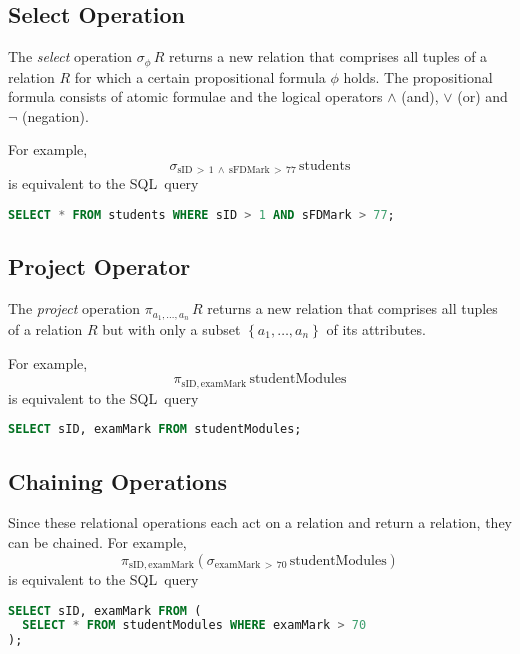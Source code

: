 \subsection{Select Operation}

The \emph{select} operation \( \sigma_{\phi}\,R \) returns a new relation that comprises all tuples of a relation \( R \) for which a certain propositional formula \( \phi \) holds.
The propositional formula consists of atomic formulae and the logical operators \( \land \) (and), \( \lor \) (or) and \( \lnot \) (negation).

For example,
\begin{equation*}
  \sigma_{\text{sID}\,>\,1\ \land\ \text{sFDMark}\,>\,77}\,\text{students}
\end{equation*}
is equivalent to the SQL~query
\begin{lstlisting}[language={SQL}]
SELECT * FROM students WHERE sID > 1 AND sFDMark > 77;
\end{lstlisting}

\subsection{Project Operator}

The \emph{project} operation \( \pi_{a_1, \ldots, a_n}\,R \) returns a new relation that comprises all tuples of a relation \( R \) but with only a subset \( \left\{ a_1, \ldots, a_n \right\} \) of its attributes.

For example,
\begin{equation*}
  \pi_{\text{sID},\,\text{examMark}}\,\text{studentModules}
\end{equation*}
is equivalent to the SQL~query
\begin{lstlisting}[language={SQL}]
SELECT sID, examMark FROM studentModules;
\end{lstlisting}

\subsection{Chaining Operations}

Since these relational operations each act on a relation and return a relation, they can be chained.
For example,
\begin{equation*}
  \pi_{\text{sID},\,\text{examMark}}\!\left( \sigma_{\text{examMark}\,>\,70}\,\text{studentModules} \right)
\end{equation*}
is equivalent to the SQL~query
\begin{lstlisting}[language={SQL}]
SELECT sID, examMark FROM (
  SELECT * FROM studentModules WHERE examMark > 70
);
\end{lstlisting}

